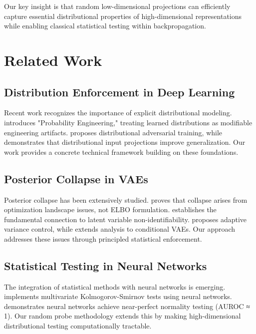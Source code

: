 \documentclass{article}
\begin{document}
Our key insight is that random low-dimensional projections can efficiently capture essential distributional properties of high-dimensional representations while enabling classical statistical testing within backpropagation.

\section{Related Work}

\subsection{Distribution Enforcement in Deep Learning}

Recent work recognizes the importance of explicit distributional modeling. \citet{zhang2025} introduces "Probability Engineering," treating learned distributions as modifiable engineering artifacts. \citet{ahmadi2024} proposes distributional adversarial training, while \citet{hao2025} demonstrates that distributional input projections improve generalization. Our work provides a concrete technical framework building on these foundations.

\subsection{Posterior Collapse in VAEs}

Posterior collapse has been extensively studied. \citet{lucas2019} proves that collapse arises from optimization landscape issues, not ELBO formulation. \citet{wang2023} establishes the fundamental connection to latent variable non-identifiability. \citet{takida2022} proposes adaptive variance control, while \citet{dang2024} extends analysis to conditional VAEs. Our approach addresses these issues through principled statistical enforcement.

\subsection{Statistical Testing in Neural Networks}

The integration of statistical methods with neural networks is emerging. \citet{paik2023} implements multivariate Kolmogorov-Smirnov tests using neural networks. \citet{simic2020} demonstrates neural networks achieve near-perfect normality testing (AUROC ≈ 1). Our random probe methodology extends this by making high-dimensional distributional testing computationally tractable.
\end{document}
